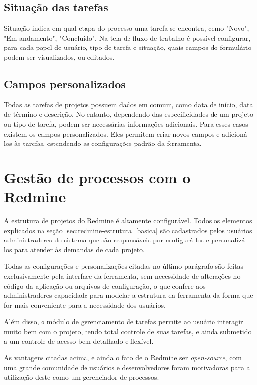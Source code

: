 \subsection{Situação das tarefas}\label{subsection:redmine-estrutura_basica-status}

Situação indica em qual etapa do processo uma tarefa se encontra, como "Novo", "Em andamento", "Concluído". Na tela de fluxo de trabalho é possível configurar, para cada papel de usuário, tipo de tarefa e situação, quais campos do formulário podem ser visualizados, ou editados.

\subsection{Campos personalizados}\label{subsection:redmine-estrutura_basica-custom_fields}

Todas as tarefas de projetos possuem dados em comum, como data de início, data de término e descrição. No entanto, dependendo das especificidades de um projeto ou tipo de tarefa, podem ser necessárias informações adicionais. Para esses casos existem os campos personalizados. Eles permitem criar novos campos e adicioná-los às tarefas, estendendo as configurações padrão da ferramenta.

\section{Gestão de processos com o Redmine}\label{sec:redmine-gestao_processos}

A estrutura de projetos do Redmine é altamente configurável. Todos os elementos explicados na seção \ref{sec:redmine-estrutura_basica} são cadastrados pelos usuários administradores do sistema que são responsáveis por configurá-los e personalizá-los para atender às demandas de cada projeto.

Todas as configurações e personalizações citadas no último parágrafo são feitas exclusivamente pela interface da ferramenta, sem necessidade de alterações no código da aplicação ou arquivos de configuração, o que confere aos administradores capacidade para modelar a estrutura da ferramenta da forma que for mais conveniente para a necessidade dos usuários.

Além disso, o módulo de gerenciamento de tarefas permite ao usuário interagir muito bem com o projeto, tendo total controle de suas tarefas, e ainda submetido a um controle de acesso bem detalhado e flexível.

As vantagens citadas acima, e ainda o fato de o Redmine ser \textit{open-source}, com uma grande comunidade de usuários e desenvolvedores foram motivadoras para a utilização deste como um gerenciador de processos.

